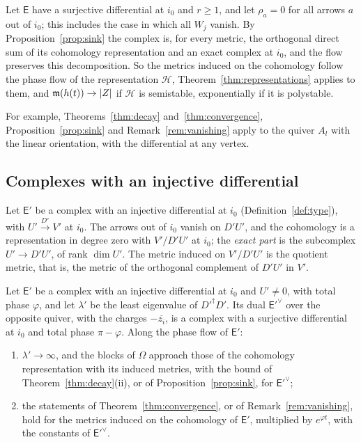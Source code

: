 \begin{remark}\label{rem:vanishing}
Let $\mathsf E$ have a surjective differential at $i_0$ and $r\geq1$, and
let $\rho_a=0$ for all arrows $a$ out of $i_0$; this includes the case in
which all $W_j$ vanish. By Proposition~\ref{prop:sink} the complex is, for
every metric, the orthogonal direct sum of its cohomology representation
and an exact complex at $i_0$, and the flow preserves this decomposition. So
the metrics induced on the cohomology follow the phase flow of the
representation $\mathcal H$, Theorem~\ref{thm:representations} applies to
them, and $\mathfrak m(h(t))\to|Z|$ if $\mathcal H$ is semistable, exponentially if
it is polystable.
\end{remark}

For example, Theorems~\ref{thm:decay} and~\ref{thm:convergence},
Proposition~\ref{prop:sink} and Remark~\ref{rem:vanishing} apply to the
quiver $A_l$ with the linear orientation, with the differential at any
vertex.

\subsection{Complexes with an injective differential}
Let $\mathsf E'$ be a complex with an injective differential at $i_0$
(Definition~\ref{def:type}), with $U'\xrightarrow{D'}V'$ at $i_0$. The
arrows out of $i_0$ vanish on $D'U'$, and the cohomology is a representation
in degree zero with $V'/D'U'$ at $i_0$; the \emph{exact part} is the
subcomplex $U'\to D'U'$, of rank $\dim U'$. The metric induced on $V'/D'U'$ is
the quotient metric, that is, the metric of the orthogonal complement of
$D'U'$ in $V'$.

\begin{proposition}\label{prop:injective}
Let $\mathsf E'$ be a complex with an injective differential at $i_0$ and
$U'\neq0$, with total phase $\varphi$, and let $\lambda'$ be the least
eigenvalue of $D'^\dagger D'$. Its dual $\mathsf E'^\vee$ over the opposite quiver, with
the charges $-\overline{z_i}$, is a complex with a surjective differential at
$i_0$ and total phase $\pi-\varphi$. Along the phase flow of $\mathsf E'$:
\begin{enumerate}
\item[(i)] $\lambda'\to\infty$, and the blocks of $\Omega$ approach those of
 the cohomology representation with its induced metrics, with the bound of
 Theorem~\ref{thm:decay}(ii), or of Proposition~\ref{prop:sink}, for
 $\mathsf E'^\vee$;
\item[(ii)] the statements of Theorem~\ref{thm:convergence}, or of
 Remark~\ref{rem:vanishing}, hold for the metrics induced on the cohomology
 of $\mathsf E'$, multiplied by $e^{\varphi t}$, with the constants of
 $\mathsf E'^\vee$.
\end{enumerate}
\end{proposition}

